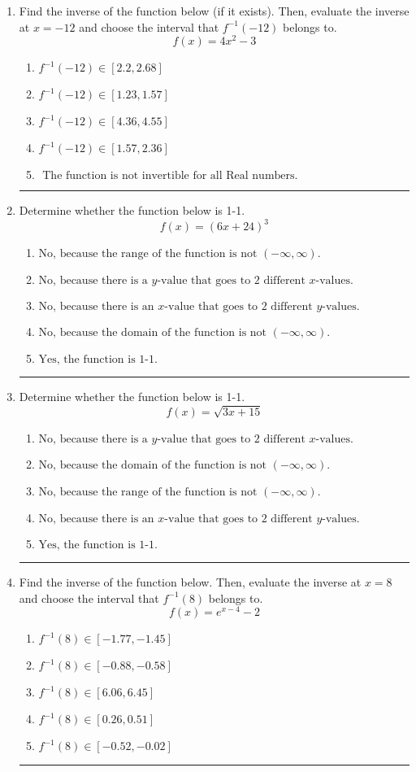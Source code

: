 \documentclass[14pt]{extbook}
\newcommand{\litem}[1]{\item#1\hspace*{-1cm}\rule{\textwidth}{0.4pt}}
\begin{document}
\begin{enumerate}
\litem{
Find the inverse of the function below (if it exists). Then, evaluate the inverse at $x = -12$ and choose the interval that $f^{-1}(-12)$ belongs to.\[ f(x) = 4 x^2 - 3 \]\begin{enumerate}[label=\Alph*.]
\item \( f^{-1}(-12) \in [2.2, 2.68] \)
\item \( f^{-1}(-12) \in [1.23, 1.57] \)
\item \( f^{-1}(-12) \in [4.36, 4.55] \)
\item \( f^{-1}(-12) \in [1.57, 2.36] \)
\item \( \text{ The function is not invertible for all Real numbers. } \)

\end{enumerate} }
\litem{
Determine whether the function below is 1-1.\[ f(x) = (6 x + 24)^3 \]\begin{enumerate}[label=\Alph*.]
\item \( \text{No, because the range of the function is not $(-\infty, \infty)$.} \)
\item \( \text{No, because there is a $y$-value that goes to 2 different $x$-values.} \)
\item \( \text{No, because there is an $x$-value that goes to 2 different $y$-values.} \)
\item \( \text{No, because the domain of the function is not $(-\infty, \infty)$.} \)
\item \( \text{Yes, the function is 1-1.} \)

\end{enumerate} }
\litem{
Determine whether the function below is 1-1.\[ f(x) = \sqrt{3 x + 15} \]\begin{enumerate}[label=\Alph*.]
\item \( \text{No, because there is a $y$-value that goes to 2 different $x$-values.} \)
\item \( \text{No, because the domain of the function is not $(-\infty, \infty)$.} \)
\item \( \text{No, because the range of the function is not $(-\infty, \infty)$.} \)
\item \( \text{No, because there is an $x$-value that goes to 2 different $y$-values.} \)
\item \( \text{Yes, the function is 1-1.} \)

\end{enumerate} }
\litem{
Find the inverse of the function below. Then, evaluate the inverse at $x = 8$ and choose the interval that $f^{-1}(8)$ belongs to.\[ f(x) = e^{x-4}-2 \]\begin{enumerate}[label=\Alph*.]
\item \( f^{-1}(8) \in [-1.77, -1.45] \)
\item \( f^{-1}(8) \in [-0.88, -0.58] \)
\item \( f^{-1}(8) \in [6.06, 6.45] \)
\item \( f^{-1}(8) \in [0.26, 0.51] \)
\item \( f^{-1}(8) \in [-0.52, -0.02] \)


\end{enumerate}}
\end{enumerate}
\end{document}
